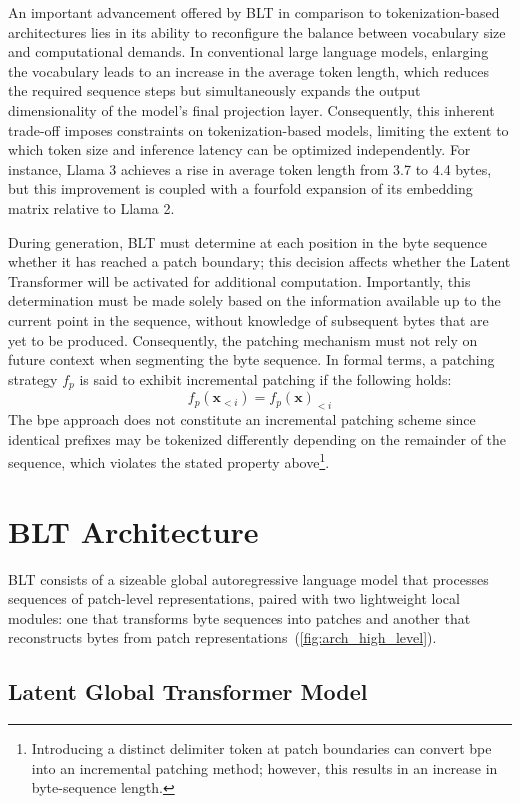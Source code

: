 An important advancement offered by {\textsc BLT} in comparison to tokenization-based architectures lies in its ability to reconfigure the balance between vocabulary size and computational demands. In conventional large language models, enlarging the vocabulary leads to an increase in the average token length, which reduces the required sequence steps but simultaneously expands the output dimensionality of the model’s final projection layer. Consequently, this inherent trade-off imposes constraints on tokenization-based models, limiting the extent to which token size and inference latency can be optimized independently. For instance, Llama 3 achieves a rise in average token length from 3.7 to 4.4 bytes, but this improvement is coupled with a fourfold expansion of its embedding matrix relative to Llama 2.

During generation, {\textsc BLT} must determine at each position in the byte sequence whether it has reached a patch boundary; this decision affects whether the Latent Transformer will be activated for additional computation. Importantly, this determination must be made solely based on the information available up to the current point in the sequence, without knowledge of subsequent bytes that are yet to be produced. Consequently, the patching mechanism must not rely on future context when segmenting the byte sequence. In formal terms, a patching strategy $f_p$ is said to exhibit incremental patching if the following holds:
$$f_p(\pmb{x}_{<i}) = f_p(\pmb{x})_{<i}$$
The bpe approach does not constitute an incremental patching scheme since identical prefixes may be tokenized differently depending on the remainder of the sequence, which violates the stated property above\footnote{Introducing a distinct delimiter token at patch boundaries can convert bpe into an incremental patching method; however, this results in an increase in byte-sequence length.}.

\section{{\textsc BLT} Architecture}
\label{section:architecture}
{\textsc BLT} consists of a sizeable global autoregressive language model that processes sequences of patch-level representations, paired with two lightweight local modules: one that transforms byte sequences into patches and another that reconstructs bytes from patch representations~(\autoref{fig:arch_high_level}).

\subsection{Latent Global Transformer Model}


